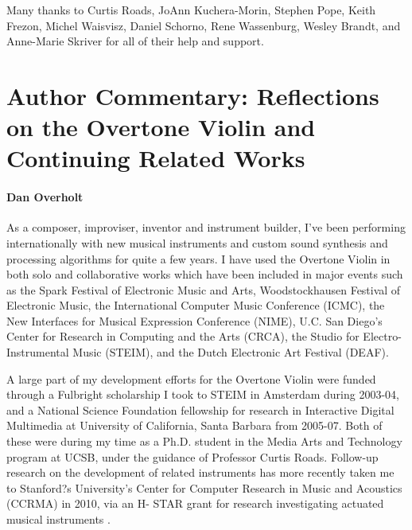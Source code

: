 \begin{acknowledgement}
Many thanks to Curtis Roads, JoAnn Kuchera-Morin, Stephen Pope, Keith Frezon,
Michel Waisvisz, Daniel Schorno, Rene Wassenburg, Wesley Brandt, and Anne-Marie
Skriver for all of their help and support.
\end{acknowledgement}

\section*{Author Commentary: Reflections on the Overtone Violin and Continuing Related Works}
\paragraph{Dan Overholt}

As a composer, improviser, inventor and instrument builder, I've been performing internationally with new musical instruments and custom sound synthesis and processing algorithms for quite a few years. I have used the Overtone Violin in both solo and collaborative works which have been included in major events such as the Spark Festival of Electronic Music and Arts, Woodstockhausen Festival of Electronic Music, the International Computer Music Conference (ICMC), the New Interfaces for Musical Expression Conference (NIME), U.C. San Diego's Center for Research in Computing and the Arts (CRCA), the Studio for Electro-Instrumental Music (STEIM), and the Dutch Electronic Art Festival (DEAF).

A large part of my development efforts for the Overtone Violin were funded through a Fulbright scholarship I took to STEIM in Amsterdam during 2003-04, and a National Science Foundation fellowship for research in Interactive Digital Multimedia at University of California, Santa Barbara from 2005-07. Both of these were during my time as a Ph.D. student in the Media Arts and Technology program at UCSB, under the guidance of Professor Curtis Roads. Follow-up research on the development of related instruments has more recently taken me to Stanford?s University's Center for Computer Research in Music and Acoustics (CCRMA) in 2010, via an H- STAR grant for research investigating actuated musical instruments \cite{Overholt:2011}.

